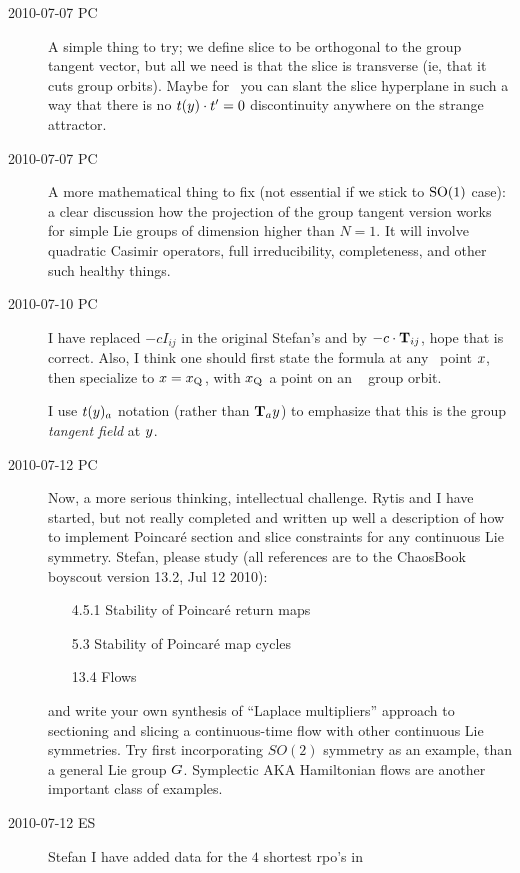 \begin{description}
\item[2010-07-07 PC]
A simple thing to try; we define slice to be orthogonal to the group tangent vector, but all we need is that the slice is transverse (ie, that it cuts group orbits). Maybe for \cLe\ you can slant the slice hyperplane in such a way that there is no
$t(y) \cdot t'_{} =0$ discontinuity anywhere on the strange attractor.

\item[2010-07-07 PC]
A more mathematical thing to fix (not essential if we stick to $\textrm{SO}(1)$ case): a clear discussion how the projection of the group tangent version works for simple Lie groups of dimension higher than $N=1$. It will involve quadratic Casimir operators, full irreducibility, completeness, and other such healthy things.

\item[2010-07-10 PC] I have replaced $-c I_{ij}$ in
the original Stefan's
 and  by
$-c \cdot \mathbf{T}_{ij}$, hope that is correct. Also,
I think one should first state the formula at any \statesp\
point $x$, then specialize to $x = x_{\mathrm{Q}_{}}$, with
$x_{\mathrm{Q}_{}}$ a point on an \reqv\ \REQB{} group orbit.

I use $t(y)_a$ notation (rather than
$\mathbf{T}_{a}y$) to emphasize that this is the
group \emph{tangent field} at $y$.

\item[2010-07-12 PC] Now, a more serious thinking,
intellectual
challenge. Rytis and I have started, but not really completed
and written up well a description of how to implement Poincar\'e
section and slice constraints for any continuous Lie symmetry.
Stefan, please study (all references are to the ChaosBook
boyscout version 13.2, Jul 12 2010):
\begin{itemize}
  \item[4.5.1] Stability of Poincar\'e return maps
  \item[5.3] Stability of Poincar\'e map cycles
  \item[13.4] Flows
\end{itemize}
and write your own synthesis of ``Laplace multipliers''
approach to sectioning and slicing a continuous-time
flow with other continuous Lie symmetries. Try first
incorporating $SO(2)$ symmetry as an example, than
a general Lie group $G$. Symplectic AKA Hamiltonian
flows are another important class of examples.

\item[2010-07-12 ES] Stefan I have added data for the $4$ shortest rpo's
in


\end{description}
